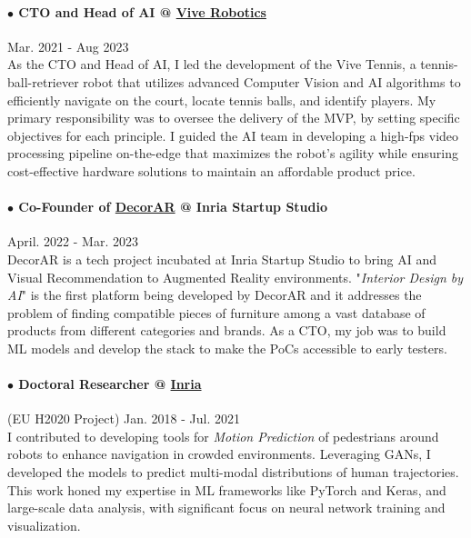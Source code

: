 \documentclass[10pt]{res}
\begin{document}
\begin{resume}
\paragraph{$\bullet$ CTO and Head of AI @ \href{http://vivetennis.com} {Vive Robotics}} \hfill Mar. 2021 - Aug 2023\\
As the CTO and Head of AI, I led the development of the Vive Tennis, a tennis-ball-retriever robot that utilizes advanced Computer Vision and AI algorithms to efficiently navigate on the court, locate tennis balls, and identify players. My primary responsibility was to oversee the delivery of the MVP, by setting specific objectives for each principle. I guided the AI team in developing a high-fps video processing pipeline on-the-edge that maximizes the robot's agility while ensuring cost-effective hardware solutions to maintain an affordable product price.
\vspace{-12pt}

\paragraph{$\bullet$ Co-Founder of \href{http://decorar.ai} {DecorAR} @ Inria Startup Studio} \hfill April. 2022 - Mar. 2023\\
DecorAR is a tech project incubated at Inria Startup Studio to bring AI and Visual Recommendation to Augmented Reality environments. "\textit{Interior Design by AI}" is the first platform being developed by DecorAR and it addresses the problem of finding compatible pieces of furniture among a vast database of products from different categories and brands. As a CTO, my job was to build ML models and develop the stack to make the PoCs accessible to early testers.
\vspace{-12pt}

\paragraph{$\bullet$ Doctoral Researcher @ \href{http://inria.fr} {Inria}} (EU H2020 Project) \hfill Jan. 2018 - Jul. 2021\\
I contributed to developing tools for \textit{Motion Prediction} of pedestrians around robots to enhance navigation in crowded environments. Leveraging GANs, I developed the models to predict multi-modal distributions of human trajectories. This work honed my expertise in ML frameworks like PyTorch and Keras, and large-scale data analysis, with significant focus on neural network training and visualization.
\vspace{-8pt}


\end{resume}
\end{document}
